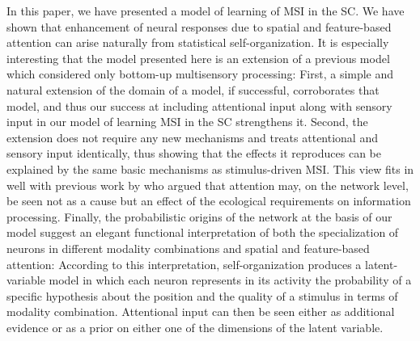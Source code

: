 \acresetall
In this paper, we have presented a model of learning of \ac{MSI} in the \ac{SC}.
We have shown that enhancement of neural responses due to spatial and feature-based attention can arise naturally from statistical self-organization.
It is especially interesting that the model presented here is an extension of a previous model which considered only bottom-up multisensory processing:
First, a simple and natural extension of the domain of a model, if successful, corroborates that model, and thus our success at including attentional input along with sensory input in our model of learning \ac{MSI} in the \ac{SC} strengthens it.
Second, the extension does not require any new mechanisms and treats attentional and sensory input identically, thus showing that the effects it reproduces can be explained by the same basic mechanisms as stimulus-driven \ac{MSI}.
This view fits in well with previous work by \citet{krauzlis-et-al-2014} who argued that attention may, on the network level, be seen not as a cause but an effect of the ecological requirements on information processing.
Finally, the probabilistic origins of the network at the basis of our model suggest an elegant functional interpretation of both the specialization of neurons in different modality combinations and spatial and feature-based attention:
According to this interpretation, self-organization produces a latent-variable model in which each neuron represents in its activity the probability of a specific hypothesis about the position and the quality of a stimulus in terms of modality combination.
Attentional input can then be seen either as additional evidence or as a prior on either one of the dimensions of the latent variable.
